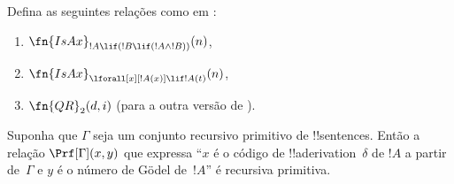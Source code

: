 \documentclass[../../../include/open-logic-section]{subfiles}
\begin{document}
\begin{prob}
Defina as seguintes relações como em
:
\begin{enumerate}
\item $\fn{IsAx}_{!A \lif (!B \lif (!A \land !B))}(n)$,
\item $\fn{IsAx}_{\lforall[x][!A(x)] \lif !A(t)}(n)$,
\item $\fn{QR}_{2}(d, i)$ (para a outra versão de \QR).
\end{enumerate}
\end{prob}

\begin{prop}
Suponha que $\Gamma$ seja um conjunto recursivo primitivo de
!!{sentence}s. Então a relação $\Prf[\Gamma](x, y)$ que expressa
``$x$ é o código de !!a{derivation}~$\delta$ de $!A$ a partir de~$\Gamma$
e $y$ é o número de G\"odel de~$!A$'' é recursiva primitiva.
\end{prop}
\end{document}
